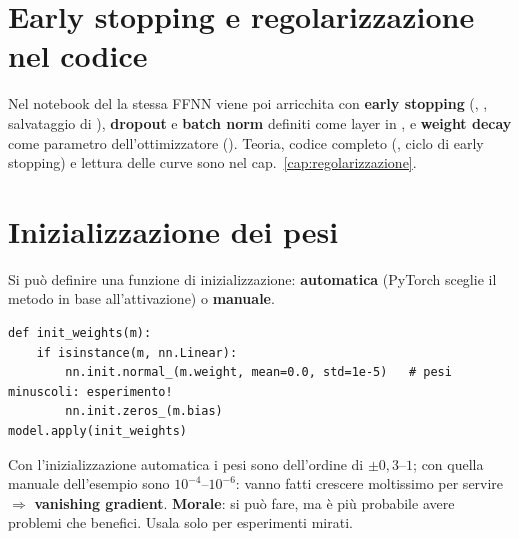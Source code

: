 \section{Early stopping e regolarizzazione nel codice}
\label{sec:ffnn-regol-codice}
Nel notebook del  la stessa FFNN viene poi arricchita con \textbf{early stopping} (,
, salvataggio di ), \textbf{dropout} e \textbf{batch norm} definiti come layer in
, e \textbf{weight decay} come parametro dell'ottimizzatore ().
Teoria, codice completo (, ciclo di early stopping) e lettura delle curve sono nel
cap.~\ref{cap:regolarizzazione}.

\section{Inizializzazione dei pesi}
Si può definire una funzione di inizializzazione: \textbf{automatica} (PyTorch sceglie il metodo in base all'attivazione) o
\textbf{manuale}.
\begin{lstlisting}
def init_weights(m):
    if isinstance(m, nn.Linear):
        nn.init.normal_(m.weight, mean=0.0, std=1e-5)   # pesi minuscoli: esperimento!
        nn.init.zeros_(m.bias)
model.apply(init_weights)
\end{lstlisting}
Con l'inizializzazione automatica i pesi sono dell'ordine di $\pm 0{,}3$--$1$; con quella manuale dell'esempio sono
$10^{-4}$--$10^{-6}$: vanno fatti crescere moltissimo per servire $\Rightarrow$ \textbf{vanishing gradient}.
\textbf{Morale}: si può fare, ma è più probabile avere problemi che benefici. Usala solo per esperimenti mirati.

